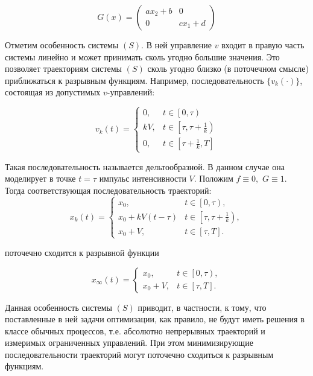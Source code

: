\begin{equation*}
  G(x) = 
  \begin{pmatrix}
    a x_2+b & 0\\ 0 & c x_1 +d 
  \end{pmatrix}
\end{equation*}
     

Отметим особенность системы $(S)$. В ней управление $v$ входит в
правую часть системы линейно и может принимать сколь угодно большие
значения. Это позволяет траекториям системы $(S)$ сколь угодно близко
(в поточечном смысле) приближаться к разрывным функциям.  Например,
последовательность $\{v_k(\cdot)\}$, состоящая из допустимых
$v$-управлений:

\begin{equation*} 
  v_k(t)=\left\{ 
    \begin{array}{ll}
      0, & t \in \left[0,\tau\right)\\
      kV,  & t\in \left[\tau,\tau+\frac{1}{k}\right)\\
      0,  & t\in \left[\tau+\frac{1}{k},T\right]
    \end{array}
  \right.
\end{equation*}

Такая последовательность
называется дельтообразной. В данном случае она моделирует в точке
$t=\tau$ импульс интенсивности $V$.  Положим $f\equiv 0,$
$G\equiv 1$. Тогда соответствующая последовательность траекторий:
\begin{equation*}
  x_{k}(t)=\left\{
    \begin{array}{ll}
      x_0, & t \in \left[0,\tau \right), \\
      x_0+kV(t-\tau) & t \in \left[\tau,\tau+\frac{1}{k} \right),\\
      x_0+V, & t\in [\tau,T].
    \end{array} \right.
\end{equation*}

поточечно сходится к разрывной функции

\begin{equation*}
  x_{\infty}(t)=\left\{
    \begin{array}{ll}
      x_0, & t \in \left[0,\tau \right), \\
      x_0+V, & t\in [\tau,T].
    \end{array} \right.
\end{equation*}

Данная особенность системы $(S)$ приводит, в частности, к тому, что
поставленные в ней задачи оптимизации, как правило, не будут иметь
решения в классе обычных процессов, т.е. абсолютно непрерывных
траекторий и измеримых ограниченных управлений. При этом
минимизирующие последовательности траекторий могут поточечно сходиться
к разрывным функциям.

